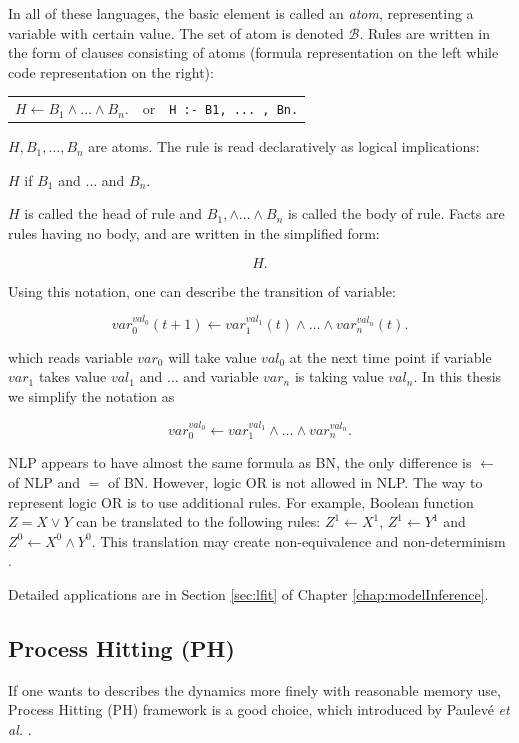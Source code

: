 In all of these languages, the basic element is called an \textit{atom}, representing a variable with certain value.
The set of atom is denoted $\mathcal{B}$.
Rules are written in the form of clauses consisting of atoms (formula representation on the left while code representation on the right):

\begin{table}[ht]
    \centering
    \begin{tabular}{ccc}
        $H \gets B_1\land\ldots\land B_n.$  & or & \texttt{H :- B1, ... , Bn.}
    \end{tabular}
\end{table}

$H,B_1,\ldots,B_n$ are atoms. 
The rule is read declaratively as logical implications:

\begin{center}
    $H$ if $B_1$ and $\ldots$ and $B_n$.
\end{center}

$H$ is called the head of rule and $B_1,\land\ldots\land B_n$ is called the body of rule.
Facts are rules having no body, and are written in the simplified form:

$$H.$$

Using this notation, one can describe the transition of variable:

    $$var_0^{val_0}(t+1) \gets var_1^{val_1}(t)\land \ldots \land var_n^{val_n}(t).$$
    
which reads variable $var_0$ will take value $val_0$ at the next time point if variable $var_1$ takes value $val_1$ and $\ldots$ and variable $var_n$ is taking value $val_n$.
In this thesis we simplify the notation as 

$$var_0^{val_0} \gets var_1^{val_1}\land \ldots \land var_n^{val_n}.$$

\begin{remark}
NLP appears to have almost the same formula as BN, the only difference is $\gets$ of NLP and $=$ of BN.
However, logic OR is not allowed in NLP.
The way to represent logic OR is to use additional rules.
For example, Boolean function $Z=X\lor Y$ can be translated to the following rules: $Z^1\gets X^1$, $Z^1\gets Y^1$ and $Z^0\gets X^0\land Y^0$.
This translation may create non-equivalence and non-determinism \cite{inoue2011logic}.
\end{remark}

Detailed applications are in Section \ref{sec:lfit} of Chapter \ref{chap:modelInference}.

\subsection{Process Hitting (PH)}
If one wants to describes the dynamics more finely with reasonable memory use, Process Hitting (PH) framework is a good choice, which introduced by Paulev\'e \textit{et al.} \cite{pauleve2011}.

